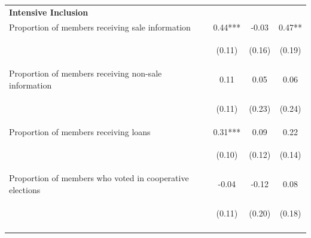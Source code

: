 \documentclass[11pt]{article}
\begin{document}
\begin{table}[H]
{\begin{tabularx}{1.1\linewidth}{lccc}
 \textbf{Intensive Inclusion} & & & \\
\noalign{\smallskip}Proportion of members receiving sale information & 0.44*** & -0.03 & 0.47**\\
 & \begin{footnotesize}(0.11)\end{footnotesize} & \begin{footnotesize}(0.16)\end{footnotesize} & \begin{footnotesize}(0.19)\end{footnotesize}\\
\noalign{\smallskip}Proportion of members receiving non-sale information & 0.11 & 0.05 & 0.06\\
 & \begin{footnotesize}(0.11)\end{footnotesize} & \begin{footnotesize}(0.23)\end{footnotesize} & \begin{footnotesize}(0.24)\end{footnotesize}\\
\noalign{\smallskip}Proportion of members receiving loans & 0.31*** & 0.09 & 0.22\\
 & \begin{footnotesize}(0.10)\end{footnotesize} & \begin{footnotesize}(0.12)\end{footnotesize} & \begin{footnotesize}(0.14)\end{footnotesize}\\
\noalign{\smallskip}Proportion of members who voted in cooperative elections & -0.04 & -0.12 & 0.08\\
 & \begin{footnotesize}(0.11)\end{footnotesize} & \begin{footnotesize}(0.20)\end{footnotesize} & \begin{footnotesize}(0.18)\end{footnotesize}\\
\noalign{\smallskip}\hline
  \end{tabularx}}
\end{table}
\doublespacing
\end{document}
